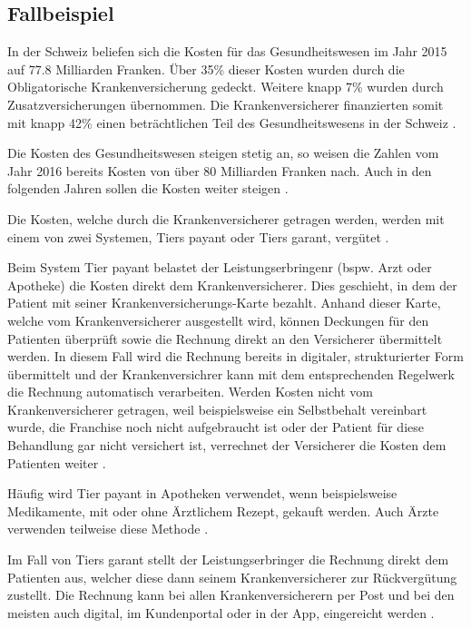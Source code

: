 \documentclass[12pt, twoside, table]{extarticle}
\begin{document}
\subsection{Fallbeispiel}

In der Schweiz beliefen sich die Kosten für das Gesundheitswesen im Jahr 2015 auf 77.8 Milliarden Franken. Über 35\% dieser Kosten wurden durch die Obligatorische Krankenversicherung gedeckt. Weitere knapp 7\% wurden durch Zusatzversicherungen übernommen. Die Krankenversicherer finanzierten somit mit knapp 42\% einen beträchtlichen Teil des Gesundheitswesens in der Schweiz \cite{BundesamtfurStatistik2018Finanzierung, BundesamtfurStatistik2017KostenDaten}.

Die Kosten des Gesundheitswesen steigen stetig an, so weisen die Zahlen vom Jahr 2016 bereits Kosten von über 80 Milliarden Franken nach. Auch in den folgenden Jahren sollen die Kosten weiter steigen \cite{BundesamtfurStatistik2018Finanzierung}.

Die Kosten, welche durch die Krankenversicherer getragen werden, werden mit einem von zwei Systemen, Tiers payant oder Tiers garant, vergütet \cite{EidgenossischesDepartementdesInnern2017FaktenblattVergutungssysteme}. 

Beim System Tier payant belastet der Leistungserbringenr (bspw. Arzt oder Apotheke) die Kosten direkt dem Krankenversicherer. Dies geschieht, in dem der Patient mit seiner Kranken\-versicherungs-Karte bezahlt. Anhand dieser Karte, welche vom Krankenversicherer ausgestellt wird, können Deckungen für den Patienten überprüft sowie die Rechnung direkt an den Versicherer übermittelt werden. In diesem Fall wird die Rechnung bereits in digitaler, strukturierter Form übermittelt und der Krankenversichrer kann mit dem entsprechenden Regelwerk die Rechnung automatisch verarbeiten. Werden Kosten nicht vom Krankenversicherer getragen, weil beispielsweise ein Selbstbehalt vereinbart wurde, die Franchise noch nicht aufgebraucht ist oder der Patient für diese Behandlung gar nicht versichert ist, verrechnet der Versicherer die Kosten dem Patienten weiter \cite{EidgenossischesDepartementdesInnern2017FaktenblattVergutungssysteme}.

Häufig wird Tier payant in Apotheken verwendet, wenn beispielsweise Medikamente, mit oder ohne Ärztlichem Rezept, gekauft werden. Auch Ärzte verwenden teilweise diese Methode .

Im Fall von Tiers garant stellt der Leistungserbringer die Rechnung direkt dem Patienten aus, welcher diese dann seinem Krankenversicherer zur Rückvergütung zustellt. Die Rechnung kann bei allen Krankenversicherern per Post und bei den meisten auch digital, im Kundenportal oder in der App, eingereicht werden \cite{EidgenossischesDepartementdesInnern2017FaktenblattVergutungssysteme}.
\end{document}
